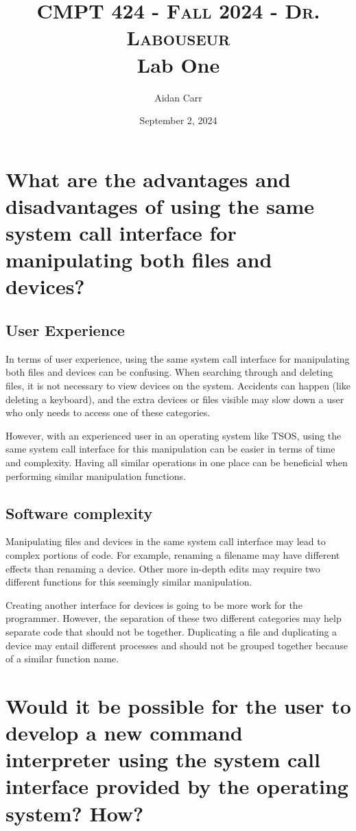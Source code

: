 \documentclass[letterpaper, 10pt,DIV=13]{scrartcl}
\title{	
   \normalfont \normalsize 
   \textsc{CMPT 424 - Fall 2024 - Dr. Labouseur} \\[10pt] %
   \huge Lab One       	    %
}
\author{Aidan Carr}
\date{\normalsize September 2, 2024} 	%
\begin{document}
\maketitle %


\section{What are the advantages and disadvantages of using the same system call interface for manipulating both files and devices?}

\subsection{User Experience}

In terms of user experience, using the same system call interface for manipulating both files and devices can be confusing. When searching through and deleting files, it is not necessary to view devices on the system. Accidents can happen (like deleting a keyboard), and the extra devices or files visible may slow down a user who only needs to access one of these categories.

However, with an experienced user in an  operating system like TSOS, using the same system call interface for this manipulation can be easier in terms of time and complexity. Having all similar operations in one place can be beneficial when performing similar manipulation functions.

\subsection{Software complexity}

Manipulating files and devices in the same system call interface may lead to complex portions of code. For example, renaming a filename may have different effects than renaming a device. Other more in-depth edits may require two different functions for this seemingly similar manipulation.

Creating another interface for devices is going to be more work for the programmer. However, the separation of these two different categories may help separate code that should not be together. Duplicating a file and duplicating a device may entail different processes and should not be grouped together because of a similar function name.


\section{Would it be possible for the user to develop a new command interpreter using the system call interface provided by the operating system? How?}
\end{document}
